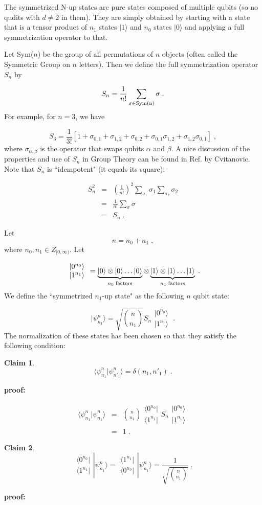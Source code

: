 \documentclass[12pt]{article}%
\newtheorem{claim}{Claim}
\newcommand{\proof}[0]{{\bf proof:} }
\newcommand{\qed}[0]{\newline\noindent{\bf QED }}
\newcommand{\bra}[1]{\langle#1|}
\newcommand{\ket}[1]{|#1\rangle}
\newcommand{\av}[1]{\langle#1\rangle}
\newcommand{\beq}{\begin{equation}}
\newcommand{\eeq}{\end{equation}}
\newcommand{\beqa}{\begin{eqnarray}}
\newcommand{\eeqa}{\end{eqnarray}}
\newcommand{\alp}[0]{{\alpha}}
\newcommand{\brazo}{ \begin{array}{r}
 \bra{0^{n_0}}
 \\
 \bra{1^{n_1}}
 \end{array}
 }
\newcommand{\ketzo}{ \begin{array}{l}
 \ket{0^{n_0}}
 \\
 \ket{1^{n_1}}
 \end{array}
 }
\begin{document}
{The symmetrized N-up states
 are pure states composed of
multiple qubits (so no qudits with $d\neq 2$ in them).
They are simply obtained by starting
with a state
that is a tensor product
of  $n_1$ states $\ket{1}$
and $n_0$ states $\ket{0}$
and applying a full symmetrization
operator to that.

Let Sym($n$) be the group
of all permutations of $n$ objects
(often called the Symmetric Group on $n$ letters).
Then we define the full symmetrization
operator $S_n$ by



\beq
S_n = \frac{1}{n!} \sum_{\sigma \in {\rm Sym(n)}}\sigma
\;.
\eeq
For example, for $n=3$, we have

\beq
S_3 = \frac{1}{3!}[
1 + \sigma_{0,1}
+ \sigma_{1,2}
+ \sigma_{0,2}
+ \sigma_{0,1}\sigma_{1,2}
+ \sigma_{1,2}\sigma_{0,1}
]
\;,
\eeq
where $\sigma_{\alp, \beta}$ is the operator
that swaps qubits $\alp$ and $\beta$.
A nice discussion of the properties and use of $S_n$
in Group Theory can be
found in Ref.\cite{cvit} by Cvitanovic.
Note that $S_n$ is ``idempotent" (it equals its square):


\beqa
S_n^2 &=& \left(\frac{1}{n!}\right)^2 \sum_{\sigma_1}\sigma_1
\sum_{\sigma_2}\sigma_2
\\
 &=&\frac{1}{n!} \sum_{\sigma}\sigma
 \\
 &=& S_n
 \;.
 \eeqa


Let
 \beq
 n = n_0 + n_1
 \;,
 \eeq
 where $n_0, n_1\in Z_{[0, \infty)}$.
Let

 \beq
 \ketzo = \underbrace{
 \ket{0}\otimes\ket{0}\ldots\ket{0}}
 _{n_0\; {\rm factors}}
 \otimes
 \underbrace{
 \ket{1}\otimes\ket{1}\ldots\ket{1}}
 _{n_1\; {\rm factors}}
 \;.
 \eeq
 We define  the ``symmetrized
 $n_1$-up state" as the following $n$ qubit state:



 \beq
 \ket{\psi^{n}_{n_1}} =
 \sqrt{n\choose n_1}S_n
\ketzo
 \;.
 \eeq
 The normalization of these states has
 been chosen so that they satisfy
 the following condition:

 \begin{claim}
 \beq
 \av{\psi^{n}_{n_1} | \psi^{n}_{n'_1}}
 = \delta(n_1, n'_1)
 \;.
 \eeq
 \end{claim}
 \proof


 \beqa
 \av{\psi^{n}_{n_1} | \psi^{n}_{n_1}}
 &=&
{n\choose n_1}
\brazo
S_n
\ketzo
 \\
 &=& 1
 \;.
 \eeqa
 \qed


 \begin{claim}
 \beq
 \brazo \ket{\psi^n_{n_1}}=
 \begin{array}{c}
  \bra{1^{n_1}}
 \\
 \bra{0^{n_0}}
 \end{array}
 \ket{\psi^n_{n_1}} =
 \frac{1}{\sqrt{n\choose n_1}}
 \;.
 \eeq
 \end{claim}
 \proof

}
\end{document}
